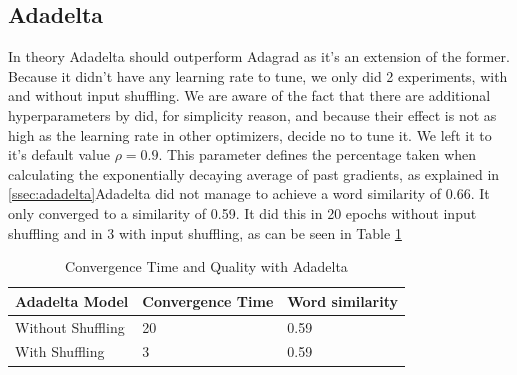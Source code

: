 \subsection{Adadelta}
In theory Adadelta \cite{adadelta} should outperform Adagrad as it's an extension of the former. Because it didn't have any learning rate to tune, we only did 2 experiments, with and without input shuffling. We are aware of the fact that there are additional hyperparameters by did, for simplicity reason, and because their effect is not as high as the learning rate in other optimizers, decide no to tune it. We left it to it's default value $\rho = 0.9$. This parameter defines the percentage taken when calculating the exponentially decaying average of past gradients, as explained in \ref{ssec:adadelta}Adadelta did not manage to achieve a word similarity of 0.66. It only converged to a similarity of 0.59. It did this in 20 epochs without input shuffling and in 3 with input shuffling, as can be seen in Table \ref{table:results_adadelta}
\begin{table}[h]
\centering
\begin{tabular}{|l|l|l|}
\hline
Adadelta Model    & Convergence Time & Word similarity \\ \hline
Without Shuffling & 20               & 0.59            \\ \hline
With Shuffling    & 3                & 0.59            \\ \hline
\end{tabular}
\caption{Convergence Time and Quality with Adadelta}
\label{table:results_adadelta}
\end{table}
